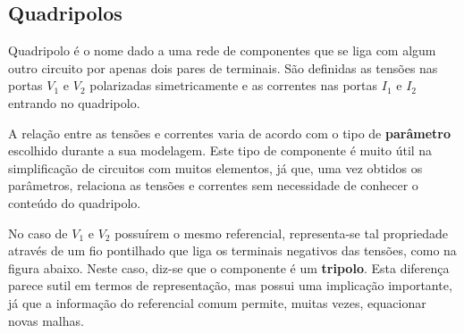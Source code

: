 \documentclass{article}
\numberwithin{equation}{section}
\begin{document}
\subsection{Quadripolos}
\label{subsec:quadripolos}
Quadripolo é o nome dado a uma rede de componentes que se liga com algum outro circuito por apenas dois pares de terminais. São definidas as tensões nas portas $V_{1}$ e $V_{2}$ polarizadas simetricamente e as correntes nas portas $I_{1}$ e $I_{2}$ entrando no quadripolo.

\begin{center}
\end{center}

A relação entre as tensões e correntes varia de acordo com o tipo de \textbf{parâmetro} escolhido durante a sua modelagem. Este tipo de componente é muito útil na simplificação de circuitos com muitos elementos, já que, uma vez obtidos os parâmetros, relaciona as tensões e correntes sem necessidade de conhecer o conteúdo do quadripolo.

No caso de $V_1$ e $V_2$ possuírem o mesmo referencial, representa-se tal propriedade através de um fio pontilhado que liga os terminais negativos das tensões, como na figura abaixo. Neste caso, diz-se que o componente é um \textbf{tripolo}. Esta diferença parece sutil em termos de representação, mas possui uma implicação importante, já que a informação do referencial comum permite, muitas vezes, equacionar novas malhas.

\begin{center}
\end{center}
\end{document}
